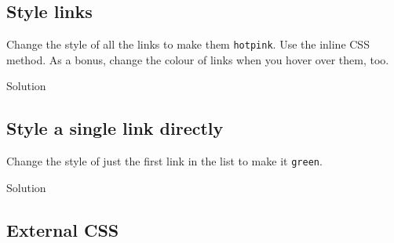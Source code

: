 \documentclass[
  oneside]{book}
\newenvironment{Shaded}{\begin{snugshade}}{\end{snugshade}}
\newcommand{\AttributeTok}[1]{\textcolor[rgb]{0.77,0.63,0.00}{#1}}
\newcommand{\FunctionTok}[1]{\textcolor[rgb]{0.00,0.00,0.00}{#1}}
\newcommand{\NormalTok}[1]{#1}
\newcommand{\SpecialCharTok}[1]{\textcolor[rgb]{0.00,0.00,0.00}{#1}}
\newcommand{\StringTok}[1]{\textcolor[rgb]{0.31,0.60,0.02}{#1}}
\begin{document}
\hypertarget{style-links}{%
\subsection{Style links}\label{style-links}}

Change the style of all the links to make them \texttt{hotpink}. Use the inline CSS method. As a bonus, change the colour of links when you hover over them, too.

Solution

\begin{Shaded}
\end{Shaded}

\hypertarget{style-a-single-link-directly}{%
\subsection{Style a single link directly}\label{style-a-single-link-directly}}

Change the style of just the first link in the list to make it \texttt{green}.

Solution

\begin{Shaded}
\end{Shaded}

\hypertarget{external-css-1}{%
\subsection{External CSS}\label{external-css-1}}
\end{document}
